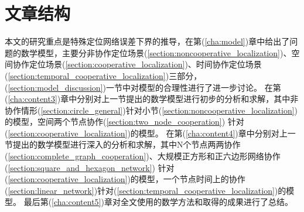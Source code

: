 \section{文章结构}
本文的研究重点是特殊定位网络误差下界的推导，在第(\ref{cha:model})章中给出了问题的数学模型，主要分非协作定位场景(\ref{section:noncooperative_localization})、空间协作定位场景(\ref{section:cooperative_localization})、时间协作定位场景(\ref{section:temporal_cooperative_localization})三部分，(\ref{section:model_discussion})一节中对模型的合理性进行了进一步讨论。
在第(\ref{cha:content3})章中分别对上一节提出的数学模型进行初步的分析和求解，其中非协作情形(\ref{section:circle_general})针对小节(\ref{section:noncooperative_localization})的模型，空间两个节点协作(\ref{section:two_node_cooperation})
针对(\ref{section:cooperative_localization})的模型。
在第(\ref{cha:content4})章中分别对上一节提出的数学模型进行深入的分析和求解，其中N个节点两两协作(\ref{section:complete_graph_cooperation})、大规模正方形和正六边形网络协作(\ref{section:square_and_hexagon_network})
针对(\ref{section:cooperative_localization})的模型，一个节点时间上的协作(\ref{section:linear_network})针对(\ref{section:temporal_cooperative_localization})的模型。
最后第(\ref{cha:content5})章对全文使用的数学方法和取得的成果进行了总结。